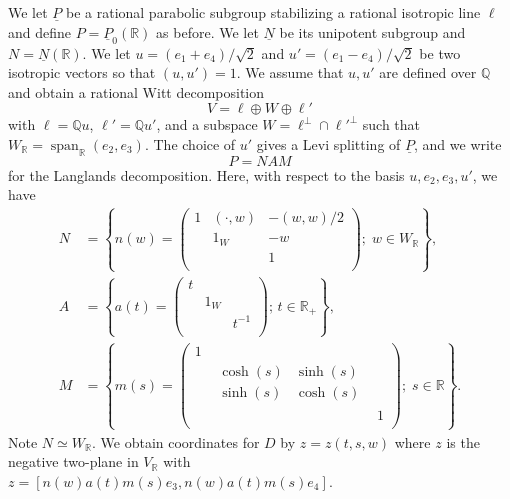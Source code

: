 \documentclass[12pt,leqno]{amsart}
\numberwithin{equation}{section}
\theoremstyle{plain}
\theoremstyle{definition}
\theoremstyle{remark}
\newcommand{\R}{\mathbb{R}}
\newcommand{\Q}{\mathbb{Q}}
\newcommand{\Span}{\operatorname{span}}
\begin{document}
We let  $\underline{P}$ be a rational parabolic subgroup stabilizing a rational isotropic line $\ell$ and define $P= \underline{P}_0(\R)$ as before. We let $\underline{N}$ be its unipotent subgroup and $N = \underline{N}(\R)$. 
We let $u =(e_1+e_4)/\sqrt{2}$ and $u' =(e_1-e_4)/\sqrt{2}$ be two isotropic vectors so that $(u,u')=1$. We assume that $u,u'$ are defined over $\Q$ and obtain a rational Witt decomposition 
\[
V = \ell \oplus W \oplus \ell'
\]
with $\ell = \Q u$, $\ell'=\Q u'$, and a subspace $W = \ell^{\perp} \cap {\ell'}^{\perp}$ such that $W_{\R} = \Span_{\R}(e_2,e_3)$. The choice of $u'$ gives a Levi splitting of $\underline{P}$, and we write
\[
P =NAM
\]
for the Langlands decomposition. Here, with respect to the basis $u,e_2,e_3,u'$, we have  
\begin{align*}
{N} &=
 \left\{ n(w)   = \left( 
\begin{smallmatrix}
1&(\cdot,w)& -(w,w)/2 \\
 &   1_W   & -w  \\
 &         & 1  \\
\end{smallmatrix} \right)
; \; w \in W_{\R} \right\}, \\ 
{A} &= \left\{ a(t) = 
\left( \begin{smallmatrix}
t& &  \\
 &   1_W   &  \\
 &         & t^{-1}\\
\end{smallmatrix} \right); \, t \in \R_+
 \right\}, \\ 
{M} & =
\left\{ m(s)  =
\left( \begin{smallmatrix}
1& & \\
 &    \begin{smallmatrix} \cosh(s) & \sinh(s) \\ \sinh(s) & \cosh(s)
 \end{smallmatrix}    & \\\
 &         & 1  \\
\end{smallmatrix} \right)
; \; s \in \R \right\}.
\end{align*}
Note $N \simeq W_{\R}$. We obtain coordinates for $D$ by $z=z(t,s,w)$ where $z$ is the negative two-plane in $V_{\R}$ with $z=[n(w)a(t)m(s)e_3,n(w)a(t)m(s)e_4]$. 
\end{document}
